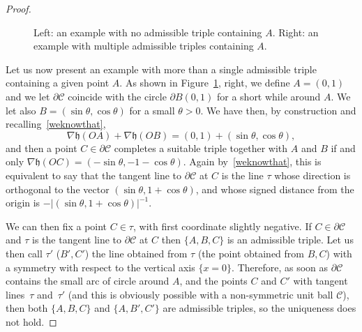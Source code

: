 \documentclass[10pt]{amsart}
\newcommand\C{\mathcal{C}}
\newcommand\h{\mathfrak h}
\theoremstyle{plain}
\theoremstyle{definition}
\begin{document}
\begin{proof}
\begin{figure}[htbp]
\caption{Left: an example with no admissible triple containing $A$. Right: an example with multiple admissible triples containing $A$.}\label{Fignonsymm}
\end{figure}
Let us now present an example with more than a single admissible triple containing a given point $A$. As shown in Figure~\ref{Fignonsymm}, right, we define $A=(0,1)$ and we let $\partial\C$ coincide with the circle $\partial B(0,1)$ for a short while around $A$. We let also $B=(\sin\theta,\cos\theta)$ for a small $\theta>0$. We have then, by construction and recalling~\eqref{weknowthat},
\[
\nabla \h(OA)+\nabla\h(OB)=(0,1) + (\sin\theta,\cos\theta),
\]
and then a point $C\in\partial\C$ completes a suitable triple together with $A$ and $B$ if and only $\nabla\h(OC)=(-\sin\theta,-1-\cos\theta)$. Again by~\eqref{weknowthat}, this is equivalent to say that the tangent line to $\partial\C$ at $C$ is the line $\tau$ whose direction is orthogonal to the vector $(\sin\theta,1+\cos\theta)$, and whose signed distance from the origin is $-\big|(\sin\theta,1+\cos\theta)\big|^{-1}$.\par
We can then fix a point $C\in \tau$, with first coordinate slightly negative. If $C\in\partial\C$ and $\tau$ is the tangent line to $\partial\C$ at $C$ then $\{A,B,C\}$ is an admissible triple. Let us then call $\tau'$ (\resp $B',C'$) the line obtained from $\tau$ (\resp the point obtained from $B,C$) with a symmetry with respect to the vertical axis $\{x=0\}$. Therefore, as soon as $\partial\C$ contains the small arc of circle around $A$, and the points $C$ and $C'$ with tangent lines~$\tau$ and~$\tau'$ (and this is obviously possible with a non-symmetric unit ball $\C$), then both $\{A,B,C\}$ and $\{A,B',C'\}$ are admissible triples, so the uniqueness does not hold.
\end{proof}
\end{document}
